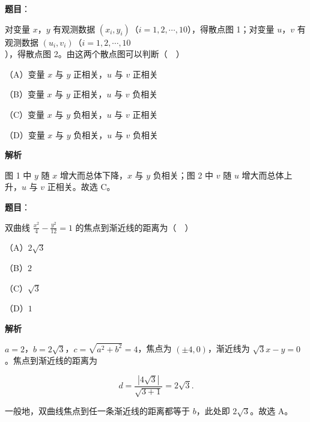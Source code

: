 \begin{answer}

\textbf{题目}：

对变量 $x$，$y$ 有观测数据 $(x_i,y_i)$（$i=1,2,\cdots,10$），得散点图 1；对变量 $u$，$v$ 有观测数据 $(u_i,v_i)$（$i=1,2,\cdots,10$），得散点图 2。由这两个散点图可以判断（　）
\nopagebreak[4]
\begin{center}\end{center}
\nopagebreak[4]
（A）变量 $x$ 与 $y$ 正相关，$u$ 与 $v$ 正相关

（B）变量 $x$ 与 $y$ 正相关，$u$ 与 $v$ 负相关

（C）变量 $x$ 与 $y$ 负相关，$u$ 与 $v$ 正相关

（D）变量 $x$ 与 $y$ 负相关，$u$ 与 $v$ 负相关

\textbf{解析}

图 1 中 $y$ 随 $x$ 增大而总体下降，$x$ 与 $y$ 负相关；图 2 中 $v$ 随 $u$ 增大而总体上升，$u$ 与 $v$ 正相关。故选 C。


\end{answer}
\begin{answer}

\textbf{题目}：

双曲线 $\frac{x^2}{4}-\frac{y^2}{12}=1$ 的焦点到渐近线的距离为（　）

（A）$2\sqrt3$

（B）$2$

（C）$\sqrt3$

（D）$1$

\textbf{解析}

$a=2$，$b=2\sqrt3$，$c=\sqrt{a^2+b^2}=4$，焦点为 $(\pm4,0)$，渐近线为 $\sqrt3x-y=0$。焦点到渐近线的距离为

\nopagebreak[4]
\[d=\frac{|4\sqrt3|}{\sqrt{3+1}}=2\sqrt3 .\]

一般地，双曲线焦点到任一条渐近线的距离都等于 $b$，此处即 $2\sqrt3$。故选 A。


\end{answer}

